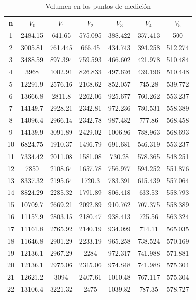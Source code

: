 \documentclass[11pt,letterpaper]{extarticle}        %
\numberwithin{equation}{section}                    %
\begin{document}
\begin{table}[H]
\centering
\caption{Volumen en los puntos de medición}
\label{t:volumen}
\begin{tabular}{|ccccccc|}
\hline
n  & $V_0$      & $V_1$      & $V_2$      & $V_3$      & $V_4$      & $V_5$      \\
\hline\hline
1  & 2484.15 & 641.65  & 575.095 & 388.422 & 357.413 & 500     \\
2  & 3005.81 & 761.445 & 665.45  & 434.743 & 394.258 & 512.274 \\
3  & 3488.59 & 897.394 & 759.593 & 466.602 & 421.978 & 510.484 \\
4  & 3968    & 1002.91 & 826.833 & 497.626 & 439.196 & 510.448 \\
5  & 12291.9 & 2576.16 & 2108.62 & 852.057 & 745.28  & 539.772 \\
6  & 13666.8 & 2811.8  & 2262.06 & 925.677 & 760.262 & 553.237 \\
7  & 14149.7 & 2928.21 & 2342.81 & 972.236 & 780.531 & 558.389 \\
8  & 14096.4 & 2966.14 & 2342.78 & 987.482 & 777.86  & 568.458 \\
9  & 14139.9 & 3091.89 & 2429.02 & 1006.96 & 788.963 & 568.693 \\
10 & 6824.75 & 1910.37 & 1496.79 & 691.681 & 546.319 & 553.237 \\
11 & 7334.42 & 2011.08 & 1581.08 & 730.28  & 578.365 & 548.251 \\
12 & 7850    & 2108.64 & 1657.78 & 756.977 & 594.252 & 551.876 \\
13 & 8337.32 & 2195.64 & 1720.3  & 783.391 & 615.439 & 557.064 \\
14 & 8824.29 & 2285.32 & 1791.89 & 806.418 & 633.53  & 558.793 \\
15 & 10709.7 & 2669.21 & 2092.89 & 910.762 & 707.375 & 558.389 \\
16 & 11157.9 & 2803.15 & 2180.47 & 938.413 & 725.56  & 563.324 \\
17 & 11161.8 & 2765.92 & 2140.19 & 934.099 & 714.11  & 565.035 \\
18 & 11646.8 & 2901.29 & 2233.19 & 965.258 & 738.524 & 570.169 \\
19 & 12136.1 & 2967.29 & 2284    & 972.317 & 741.988 & 571.881 \\
20 & 12136.1 & 2975.06 & 2315.06 & 974.848 & 741.988 & 575.304 \\
21 & 12621.2 & 3094    & 2407.61 & 1010.48 & 767.117 & 575.304 \\
22 & 13106.4 & 3221.32 & 2475    & 1039.82 & 787.35  & 578.727 \\

\end{tabular}
\end{table}
\end{document}
